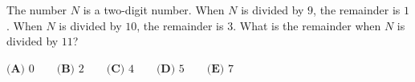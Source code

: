 The number $N$ is a two-digit number. When $N$ is divided by $9$, the remainder is $1$. When $N$ is divided by $10$, the remainder is $3$. What is the remainder when $N$ is divided by $11$?

$\textbf{(A) }0\qquad\textbf{(B) }2\qquad\textbf{(C) }4\qquad\textbf{(D) }5\qquad\textbf{(E) }7$
